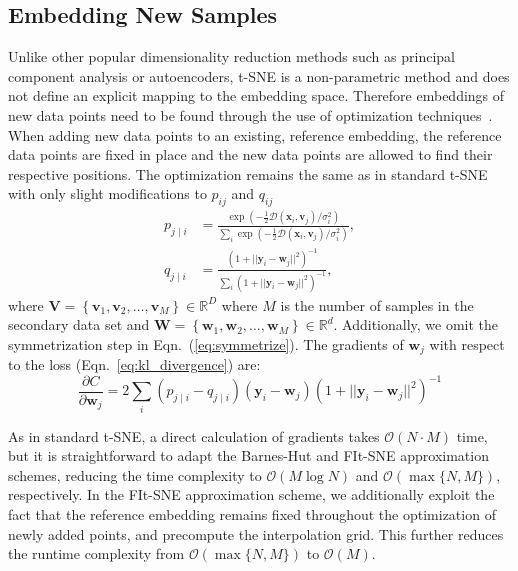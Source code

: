 \documentclass[twocolumn]{bmcart}
\begin{document}
\subsection*{Embedding New Samples}

Unlike other popular dimensionality reduction methods such as principal component analysis or autoencoders, t-SNE is a non-parametric method and does not define an explicit mapping to the embedding space. Therefore embeddings of new data points need to be found through the use of optimization techniques~\cite{policar2019embedding}. When adding new data points to an existing, reference embedding, the reference data points are fixed in place and the new data points are allowed to find their respective positions. The optimization remains the same as in standard t-SNE with only slight modifications to $p_{ij}$ and $q_{ij}$
\begin{align}
p_{j \mid i} &= \frac{\exp \left ( -\frac{1}{2} \mathcal{D}(\mathbf{x}_i, \mathbf{v}_j) /  \sigma_i^2 \right )}{\sum_{i} \exp \left ( -\frac{1}{2} \mathcal{D}(\mathbf{x}_i, \mathbf{v}_j) / \sigma_i^2 \right )}, \\
q_{j \mid i} &= \frac{\left ( 1 + || \mathbf{y}_i - \mathbf{w}_j ||^2 \right )^{-1}}{\sum_{i}\left ( 1 + || \mathbf{y}_i - \mathbf{w}_j ||^2 \right )^{-1}},
\end{align}
\noindent where $\mathbf{V} = \left \{ \mathbf{v}_1, \mathbf{v}_2, \dots,
\mathbf{v}_M \right \} \in \mathbb{R}^D$ where $M$ is the number of samples in
the secondary data set and $\mathbf{W} = \left \{ \mathbf{w}_1, \mathbf{w}_2, \dots,
\mathbf{w}_M \right \} \in \mathbb{R}^d$. Additionally, we omit the
symmetrization step in Eqn.~(\ref{eq:symmetrize}). The gradients of
$\mathbf{w}_j$ with respect to the loss (Eqn.~\ref{eq:kl_divergence}) are:
\begin{equation}
\frac{\partial C}{\partial \mathbf{w}_j} = 2 \sum_i \left ( p_{j \mid i} - q_{j \mid i} \right ) \left ( \mathbf{y}_i - \mathbf{w}_j \right ) \left ( 1 + || \mathbf{y}_i - \mathbf{w}_j || ^2 \right )^{-1}
\label{eq:gradient}
\end{equation}

As in standard t-SNE, a direct calculation of gradients takes $\mathcal{O}(N \cdot M)$ time, but it is straightforward to adapt the Barnes-Hut and FIt-SNE approximation schemes, reducing the time complexity to $\mathcal{O}(M \log N)$ and $\mathcal{O}(\max \{ N, M \})$, respectively. In the FIt-SNE approximation scheme, we additionally exploit the fact that the reference embedding remains fixed throughout the optimization of newly added points, and precompute the interpolation grid. This further reduces the runtime complexity from $\mathcal{O}(\max \{ N, M \})$ to $\mathcal{O}(M)$.
\end{document}
